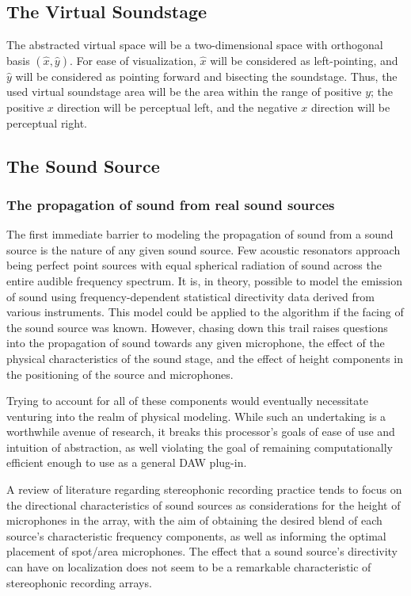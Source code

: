 \subsection{The Virtual Soundstage}

The abstracted virtual space will be a two-dimensional space with orthogonal basis $(\hat{x},\hat{y})$. For ease of visualization, $\hat{x}$ will be considered as left-pointing, and $\hat{y}$ will be considered as pointing forward and bisecting the soundstage. Thus, the used virtual soundstage area will be the area within the range of positive $y$; the positive $x$ direction will be perceptual left, and the negative $x$ direction will be perceptual right.

\subsection{The Sound Source}

\subsubsection{The propagation of sound from real sound sources}

The first immediate barrier to modeling the propagation of sound from a sound source is the nature of any given sound source. Few acoustic resonators approach being perfect point sources with equal spherical radiation of sound across the entire audible frequency spectrum. It is, in theory, possible to model the emission of sound using frequency-dependent statistical directivity data derived from various instruments. This model could be applied to the algorithm if the facing of the sound source was known. However, chasing down this trail raises questions into the propagation of sound towards any given microphone, the effect of the physical characteristics of the sound stage, and the effect of height components in the positioning of the source and microphones. 

Trying to account for all of these components would eventually necessitate venturing into the realm of physical modeling. While such an undertaking is a worthwhile avenue of research, it breaks this processor's goals of ease of use and intuition of abstraction, as well violating the goal of remaining computationally efficient enough to use as a general DAW plug-in. 

A review of literature regarding stereophonic recording practice tends to focus on the directional characteristics of sound sources as considerations for the height of microphones in the array, with the aim of obtaining the desired blend of each source’s characteristic frequency components, as well as informing the optimal placement of spot/area microphones. The effect that a sound source's directivity can have on localization does not seem to be a remarkable characteristic of stereophonic recording arrays.

